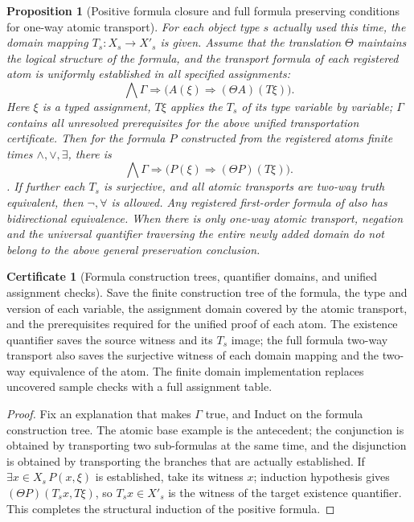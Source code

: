 \documentclass[12pt,a4paper,openany,notitlepage]{report}
\theoremstyle{plain}
\newtheorem{proposition}[theorem]{Proposition}
\theoremstyle{definition}
\newtheorem*{certificate}{Certificate}
\theoremstyle{remark}
\begin{document}
\begin{CJK*}
\begin{proposition}
[Positive formula closure and full formula preserving conditions for one-way atomic transport]\label{exp:gov:formula-transport}
For each object type $s$ actually used this time, the domain mapping $T_s:X_s\to X'_s$ is given. Assume that the translation $\Theta$ maintains the logical structure of the formula, and the transport formula of each registered atom is uniformly established in all specified assignments: \[
 \bigwedge\Gamma\Rightarrow
 \bigl(A(\xi)\Rightarrow(\Theta A)(T\xi)\bigr).
\] Here $\xi$ is a typed assignment, $T\xi$ applies the $T_s$ of its type variable by variable; $\Gamma$ contains all unresolved prerequisites for the above unified transportation certificate. Then for the formula $P$ constructed from the registered atoms finite times $\land,\lor,\exists$, there is \[
 \bigwedge\Gamma\Rightarrow
 \bigl(P(\xi)\Rightarrow(\Theta P)(T\xi)\bigr).
\]. If further each $T_s$ is surjective, and all atomic transports are two-way truth equivalent, then $\neg,\forall$ is allowed. Any registered first-order formula of also has bidirectional equivalence. When there is only one-way atomic transport, negation and the universal quantifier traversing the entire newly added domain do not belong to the above general preservation conclusion.\end{proposition}
\begin{certificate}
[Formula construction trees, quantifier domains, and unified assignment checks]Save the finite construction tree of the formula, the type and version of each variable, the assignment domain covered by the atomic transport, and the prerequisites required for the unified proof of each atom. The existence quantifier saves the source witness and its $T_s$ image; the full formula two-way transport also saves the surjective witness of each domain mapping and the two-way equivalence of the atom. The finite domain implementation replaces uncovered sample checks with a full assignment table.\end{certificate}
\begin{proof}
Fix an explanation that makes $\Gamma$ true, and Induct on the formula construction tree. The atomic base example is the antecedent; the conjunction is obtained by transporting two sub-formulas at the same time, and the disjunction is obtained by transporting the branches that are actually established. If $\exists x\in X_s\,P(x,\xi)$ is established, take its witness $x$; induction hypothesis gives $(\Theta P)(T_sx,T\xi)$, so $T_sx\in X'_s$ is the witness of the target existence quantifier. This completes the structural induction of the positive formula.


\end{proof}
\end{CJK*}
\end{document}
